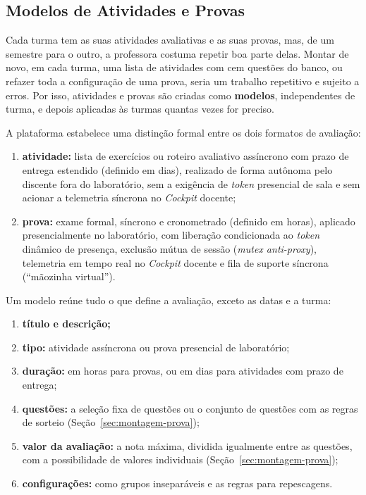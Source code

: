 \subsection{Modelos de Atividades e Provas}
\label{sec:modelos-avaliacao}

Cada turma tem as suas atividades avaliativas e as suas provas, mas, de um semestre para o outro, a professora costuma repetir boa parte delas. Montar de novo, em cada turma, uma lista de atividades com cem questões do banco, ou refazer toda a configuração de uma prova, seria um trabalho repetitivo e sujeito a erros. Por isso, atividades e provas são criadas como \textbf{modelos}, independentes de turma, e depois aplicadas às turmas quantas vezes for preciso.

A plataforma estabelece uma distinção formal entre os dois formatos de avaliação:
\begin{enumerate}
    \item \textbf{atividade:} lista de exercícios ou roteiro avaliativo assíncrono com prazo de entrega estendido (definido em dias), realizado de forma autônoma pelo discente fora do laboratório, sem a exigência de \textit{token} presencial de sala e sem acionar a telemetria síncrona no \textit{Cockpit} docente;
    \item \textbf{prova:} exame formal, síncrono e cronometrado (definido em horas), aplicado presencialmente no laboratório, com liberação condicionada ao \textit{token} dinâmico de presença, exclusão mútua de sessão (\textit{mutex anti-proxy}), telemetria em tempo real no \textit{Cockpit} docente e fila de suporte síncrona (``mãozinha virtual'').
\end{enumerate}

Um modelo reúne tudo o que define a avaliação, exceto as datas e a turma:

\begin{enumerate}
    \item \textbf{título e descrição;}
    \item \textbf{tipo:} atividade assíncrona ou prova presencial de laboratório;
    \item \textbf{duração:} em horas para provas, ou em dias para atividades com prazo de entrega;
    \item \textbf{questões:} a seleção fixa de questões ou o conjunto de questões com as regras de sorteio (Seção~\ref{sec:montagem-prova});
    \item \textbf{valor da avaliação:} a nota máxima, dividida igualmente entre as questões, com a possibilidade de valores individuais (Seção~\ref{sec:montagem-prova});
    \item \textbf{configurações:} como grupos inseparáveis e as regras para repescagens.
\end{enumerate}


